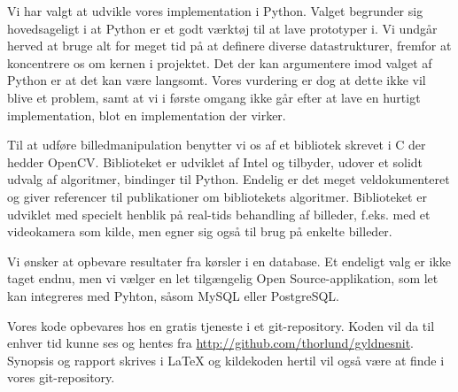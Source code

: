 Vi har valgt at udvikle vores implementation i Python. Valget begrunder
sig hovedsageligt i at Python er et godt værktøj til at lave prototyper
i. Vi undgår herved at bruge alt for meget tid på at definere diverse
datastrukturer, fremfor at koncentrere os om kernen i projektet. Det der
kan argumentere imod valget af Python er at det kan være langsomt. Vores
vurdering er dog at dette ikke vil blive et problem, samt at vi i første
omgang ikke går efter at lave en hurtigt implementation, blot en
implementation der virker.

Til at udføre billedmanipulation benytter vi os af et bibliotek skrevet i C der
hedder OpenCV. Biblioteket er udviklet af Intel og tilbyder, udover et solidt
udvalg af algoritmer, bindinger til Python. Endelig er det meget
veldokumenteret og giver referencer til publikationer om bibliotekets
algoritmer. Biblioteket er udviklet med specielt henblik på real-tids
behandling af billeder, f.eks. med et videokamera som kilde, men egner sig også
til brug på enkelte billeder.

Vi ønsker at opbevare resultater fra kørsler i en database. Et endeligt
valg er ikke taget endnu, men vi vælger en let tilgængelig Open
Source-applikation, som let kan integreres med Pyhton, såsom MySQL eller
PostgreSQL.

Vores kode opbevares hos en gratis tjeneste i et git-repository. Koden
vil da til enhver tid kunne ses og hentes fra
\href{http://github.com/thorlund/gyldnesnit}{http://github.com/thorlund/gyldnesnit}.
Synopsis og rapport skrives i \LaTeX{} og kildekoden hertil vil også være
at finde i vores git-repository.
